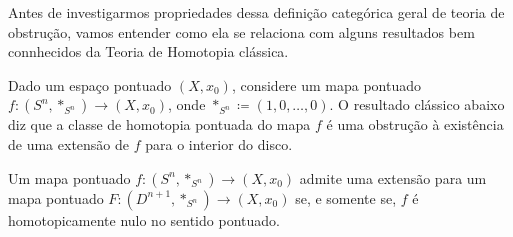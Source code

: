 Antes de investigarmos propriedades dessa definição categórica geral de teoria de obstrução, vamos entender como ela se relaciona com alguns resultados bem connhecidos da Teoria de Homotopia clássica.

Dado um espaço pontuado $(X,x_{0})$, considere um mapa pontuado $f: (S^{n},*_{S^{n}}) \to (X,x_{0})$, onde $*_{S^{n}} \coloneqq (1,0,\dots,0)$.
O resultado clássico abaixo diz que a classe de homotopia pontuada do mapa $f$ é uma obstrução à existência de uma extensão de $f$ para o interior do disco.

\begin{teo}
  Um mapa pontuado $f: (S^{n},*_{S^{n}}) \to (X,x_{0})$ admite uma extensão para um mapa pontuado $F: (D^{n+1},*_{S^{n}}) \to (X,x_{0})$ se, e somente se, $f$ é homotopicamente nulo no sentido pontuado.
\end{teo}

